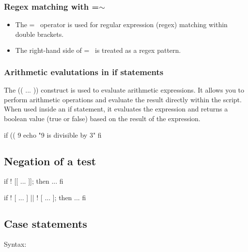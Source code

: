 \documentclass{report}
\begin{document}
    \bigbreak \noindent 
    \subsubsection{Regex matching with =$\sim$}
    \bigbreak \noindent 
    \begin{itemize}
        \item The =~ operator is used for regular expression (regex) matching within double brackets.
        \item The right-hand side of =~ is treated as a regex pattern.
    \end{itemize}

    \bigbreak \noindent
    \subsubsection{Arithmetic evalutations in if statements}
    \bigbreak \noindent 
    The (( ... )) construct is used to evaluate arithmetic expressions. It allows you to perform arithmetic operations and evaluate the result directly within the script. When used inside an if statement, it evaluates the expression and returns a boolean value (true or false) based on the result of the expression.
    \bigbreak \noindent 
    \begin{bashcode}
    if (( 9 %
        echo "9 is divisible by 3"
    fi 
    \end{bashcode}

    \bigbreak \noindent 
    \subsection{Negation of a test}
    \bigbreak \noindent 
    \begin{bashcode}
        if ! [[ ... ]]; then
            ...
        fi
    \end{bashcode}
    \bigbreak \noindent 
    \bigbreak \noindent 
    \begin{bashcode}
        if ! [ ... ] || ! [ ... ]; then
            ...
        fi
    \end{bashcode}
    

    \pagebreak \bigbreak \noindent 
    \subsection{Case statements}
    \bigbreak \noindent 
    Syntax:
    
\end{document}
